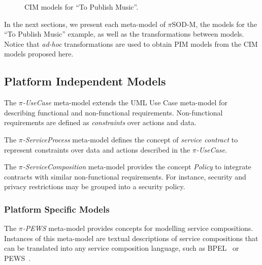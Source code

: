 \begin{figure}
\caption{\label{fig:CIM:tpm} CIM models for ``To Publish Music''.}
\end{figure}

In the next sections, we present each meta-model of $\pi$SOD-M, the models for the ``To Publish Music'' example, as well as the transformations between models.
Notice that \textit{ad-hoc} transformations are used to obtain PIM models from the CIM models proposed here. 



\subsection{Platform Independent Models}
 The \textit{$\pi$-UseCase} meta-model extends the UML Use Case meta-model for describing functional and non-functional requirements. Non-functional requirements are defined as \textit{constraints} over actions and data.
 
The \textit{$\pi$-ServiceProcess} meta-model defines the concept of \textit{service contract} to represent constraints over data and actions 
described in the \textit{$\pi$-UseCase}.

The \textit{$\pi$-ServiceComposition} meta-model provides the concept  \textit{Policy}
to integrate contracts with similar non-functional requirements.
For instance, security and privacy restrictions may be grouped into a security policy.



\subsubsection{Platform Specific Models}

The \textit{$\pi$-PEWS} meta-model provides concepts for modelling service compositions. 
Instances of this meta-model are textual descriptions of service compositions that can be translated into any service composition language, such as BPEL~\cite{bpel03} or PEWS~\cite{BaCAM05,Placido2010LTPD}.

